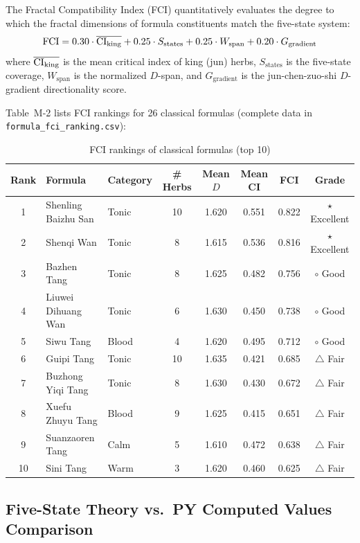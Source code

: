 \documentclass[12pt,a4paper,twocolumn]{article}
\begin{document}
The Fractal Compatibility Index (FCI) quantitatively evaluates the degree to which the fractal dimensions of formula constituents match the five-state system:
\begin{equation}
{\rm FCI} = 0.30 \cdot \overline{{\rm CI}_{\text{king}}} + 0.25 \cdot S_{\text{states}} + 0.25 \cdot W_{\text{span}} + 0.20 \cdot G_{\text{gradient}}
\end{equation}
where $\overline{{\rm CI}_{\text{king}}}$ is the mean critical index of king (jun) herbs, $S_{\text{states}}$ is the five-state coverage, $W_{\text{span}}$ is the normalized $D$-span, and $G_{\text{gradient}}$ is the jun-chen-zuo-shi $D$-gradient directionality score.

Table~M-2 lists FCI rankings for 26 classical formulas (complete data in \texttt{formula\_fci\_ranking.csv}):
\begin{table}[H]
\centering
\footnotesize
\caption{FCI rankings of classical formulas (top 10)}
\begin{tabular}{c|l|l|c|c|c|c|c}
\hline
\textbf{Rank} & \textbf{Formula} & \textbf{Category} & \textbf{\# Herbs} & \textbf{Mean $D$} & \textbf{Mean CI} & \textbf{FCI} & \textbf{Grade} \\
\hline
1 & Shenling Baizhu San & Tonic & 10 & 1.620 & 0.551 & 0.822 & $\star$ Excellent \\
2 & Shenqi Wan & Tonic & 8 & 1.615 & 0.536 & 0.816 & $\star$ Excellent \\
3 & Bazhen Tang & Tonic & 8 & 1.625 & 0.482 & 0.756 & $\circ$ Good \\
4 & Liuwei Dihuang Wan & Tonic & 6 & 1.630 & 0.450 & 0.738 & $\circ$ Good \\
5 & Siwu Tang & Blood & 4 & 1.620 & 0.495 & 0.712 & $\circ$ Good \\
6 & Guipi Tang & Tonic & 10 & 1.635 & 0.421 & 0.685 & $\triangle$ Fair \\
7 & Buzhong Yiqi Tang & Tonic & 8 & 1.630 & 0.430 & 0.672 & $\triangle$ Fair \\
8 & Xuefu Zhuyu Tang & Blood & 9 & 1.625 & 0.415 & 0.651 & $\triangle$ Fair \\
9 & Suanzaoren Tang & Calm & 5 & 1.610 & 0.472 & 0.638 & $\triangle$ Fair \\
10 & Sini Tang & Warm & 3 & 1.620 & 0.460 & 0.625 & $\triangle$ Fair \\
\hline
\end{tabular}
\end{table}

\subsection{Five-State Theory vs.\ PY Computed Values Comparison}
\label{subsec:five_state_comparison_en}
\end{document}
